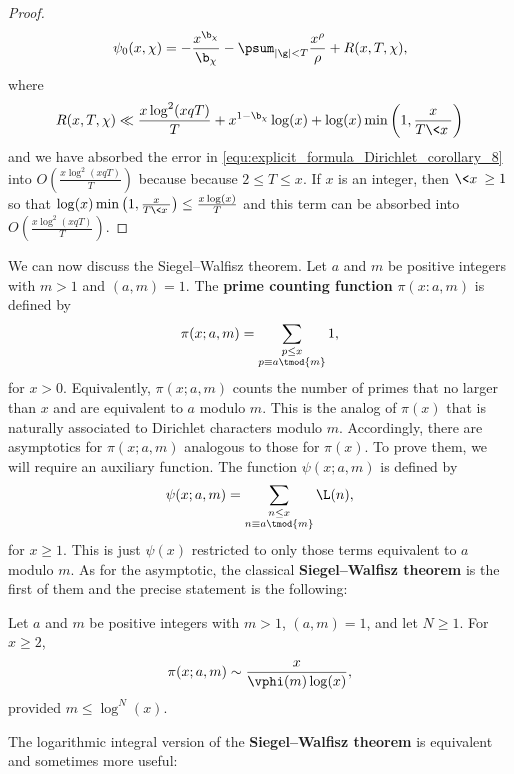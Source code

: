 \begin{proof}
      \begin{equation}\label{equ:explicit_formula_Dirichlet_corollary_10}
        \psi_{0}(x,\chi) = -\frac{x^{\b_{\chi}}}{\b_{\chi}}-\psum_{|\g| < T}\frac{x^{\rho}}{\rho}+R(x,T,\chi),
      \end{equation}
      where
      \[
        R(x,T,\chi) \ll \frac{x\log^{2}(xqT)}{T}+x^{1-\b_{\chi}}\log(x)+\log(x)\min\left(1,\frac{x}{T\<x\>}\right)
      \]
      and we have absorbed the error in \cref{equ:explicit_formula_Dirichlet_corollary_8} into $O\left(\frac{x\log^{2}(xqT)}{T}\right)$ because because $2 \le T \le x$. If $x$ is an integer, then $\<x\> \ge 1$ so that $\log(x)\min\left(1,\frac{x}{T\<x\>}\right) \le \frac{x\log(x)}{T}$ and this term can be absorbed into $O\left(\frac{x\log^{2}(xqT)}{T}\right)$.
    \end{proof}
    
    We can now discuss the Siegel–Walfisz theorem. Let $a$ and $m$ be positive integers with $m > 1$ and $(a,m) = 1$. The \textbf{prime counting function} $\pi(x:a,m)$ is defined by
    \[
      \pi(x;a,m) = \sum_{\substack{p \le x \\ p \equiv a \tmod{m}}}1,
    \]
    for $x > 0$. Equivalently, $\pi(x;a,m)$ counts the number of primes that no larger than $x$ and are equivalent to $a$ modulo $m$. This is the analog of $\pi(x)$ that is naturally associated to Dirichlet characters modulo $m$. Accordingly, there are asymptotics for $\pi(x;a,m)$ analogous to those for $\pi(x)$. To prove them, we will require an auxiliary function. The function $\psi(x;a,m)$ is defined by
    \[
      \psi(x;a,m) = \sum_{\substack{n \le x \\ n \equiv a \tmod{m}}}\L(n),
    \]
    for $x \ge 1$. This is just $\psi(x)$ restricted to only those terms equivalent to $a$ modulo $m$. As for the asymptotic, the classical \textbf{Siegel–Walfisz theorem} is the first of them and the precise statement is the following:

    \begin{theorem}
      Let $a$ and $m$ be positive integers with $m > 1$, $(a,m) = 1$, and let $N \ge 1$. For $x \ge 2$,
      \[
        \pi(x;a,m) \sim \frac{x}{\vphi(m)\log(x)},
      \]
      provided $m \le \log^{N}(x)$.
    \end{theorem}
    
    The logarithmic integral version of the \textbf{Siegel–Walfisz theorem} is equivalent and sometimes more useful:


